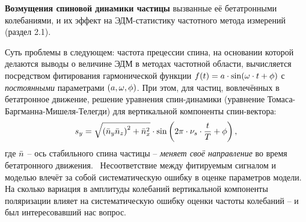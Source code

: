 \textbf{Возмущения спиновой динамики частицы} вызванные её бетатронными колебаниями, и их эффект на ЭДМ-статистику частотного метода измерений (раздел 2.1).

Суть проблемы в следующем: частота прецессии спина, на основании которой делаются выводы о величине ЭДМ в 
методах частотной области, вычисляется посредством фитирования гармонической функции 
${f(t) = a\cdot\sin(\omega\cdot t + \phi)}$ с \emph{постоянными} параметрами $(a,\omega,\phi)$. При этом, для частиц, вовлечённых
в бетатронное движение, решение уравнения спин-динамики (уравнение Томаса-Баргманна-Мишеля-Телегди)
для вертикальной компоненты спин-вектора:
\begin{equation}\label{eq:sy_analytic}
s_y = \sqrt{\bkt{\bar n_y\bar n_z}^2 + \bar n_x^2} \cdot \sin\bkt{2\pi\cdot\nu_s\cdot \frac{t}{T} + \phi},
\end{equation}
где $\bar n$ -- ось стабильного спина частицы -- \emph{меняет своё направление} во время бетатронного движения.~\cite[стр.~11]{Shatunov} Несоответствие между фитируемым сигналом и моделью влечёт за собой
систематическую ошибку в оценке параметров модели. На сколько вариация в амплитуды колебаний вертикальной
компоненты поляризации влияет на систематическую ошибку оценки частоты колебаний -- 
и был интересовавший нас вопрос.

